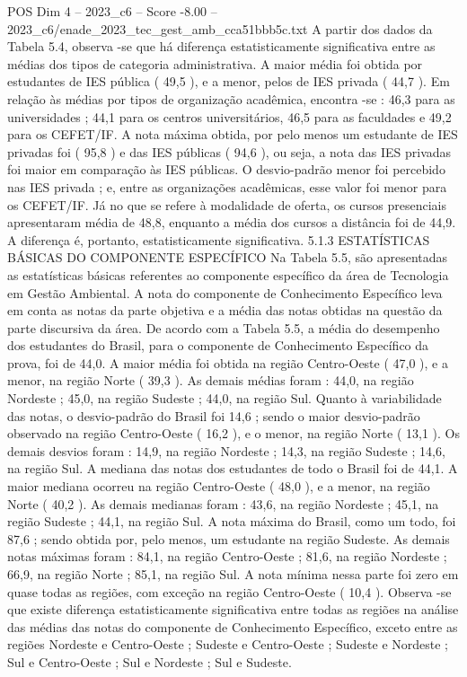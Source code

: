 \begin{textsample}{POS Dim 4 – 2023\_c6 – Score -8.00 – 2023\_c6/enade\_2023\_tec\_gest\_amb\_cca51bbb5c.txt}
A partir dos dados da Tabela 5.4, observa -se que há diferença estatisticamente significativa entre as médias dos tipos de categoria administrativa.
A maior média foi obtida por estudantes de IES pública ( 49,5 ), e a menor, pelos de IES privada ( 44,7 ).
Em relação às médias por tipos de organização acadêmica, encontra -se : 46,3 para as universidades ; 44,1 para os centros universitários, 46,5 para as faculdades e 49,2 para os CEFET/IF.
A nota máxima obtida, por pelo menos um estudante de IES privadas foi ( 95,8 ) e das IES públicas ( 94,6 ), ou seja, a nota das IES privadas foi maior em comparação às IES públicas.
O desvio-padrão menor foi percebido nas IES privada ; e, entre as organizações acadêmicas, esse valor foi menor para os CEFET/IF.
Já no que se refere à modalidade de oferta, os cursos presenciais apresentaram média de 48,8, enquanto a média dos cursos a distância foi de 44,9.
A diferença é, portanto, estatisticamente significativa. 5.1.3 ESTATÍSTICAS BÁSICAS DO COMPONENTE ESPECÍFICO Na Tabela 5.5, são apresentadas as estatísticas básicas referentes ao componente específico da área de Tecnologia em Gestão Ambiental.
A nota do componente de Conhecimento Específico leva em conta as notas da parte objetiva e a média das notas obtidas na questão da parte discursiva da área.
De acordo com a Tabela 5.5, a média do desempenho dos estudantes do Brasil, para o componente de Conhecimento Específico da prova, foi de 44,0.
A maior média foi obtida na região Centro-Oeste ( 47,0 ), e a menor, na região Norte ( 39,3 ).
As demais médias foram : 44,0, na região Nordeste ; 45,0, na região Sudeste ; 44,0, na região Sul.
Quanto à variabilidade das notas, o desvio-padrão do Brasil foi 14,6 ; sendo o maior desvio-padrão observado na região Centro-Oeste ( 16,2 ), e o menor, na região Norte ( 13,1 ).
Os demais desvios foram : 14,9, na região Nordeste ; 14,3, na região Sudeste ; 14,6, na região Sul.
A mediana das notas dos estudantes de todo o Brasil foi de 44,1.
A maior mediana ocorreu na região Centro-Oeste ( 48,0 ), e a menor, na região Norte ( 40,2 ).
As demais medianas foram : 43,6, na região Nordeste ; 45,1, na região Sudeste ; 44,1, na região Sul.
A nota máxima do Brasil, como um todo, foi 87,6 ; sendo obtida por, pelo menos, um estudante na região Sudeste.
As demais notas máximas foram : 84,1, na região Centro-Oeste ; 81,6, na região Nordeste ; 66,9, na região Norte ; 85,1, na região Sul.
A nota mínima nessa parte foi zero em quase todas as regiões, com exceção na região Centro-Oeste ( 10,4 ).
Observa -se que existe diferença estatisticamente significativa entre todas as regiões na análise das médias das notas do componente de Conhecimento Específico, exceto entre as regiões Nordeste e Centro-Oeste ; Sudeste e Centro-Oeste ; Sudeste e Nordeste ; Sul e Centro-Oeste ; Sul e Nordeste ; Sul e Sudeste.

\end{textsample}
